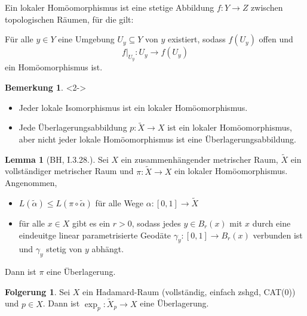 \documentclass{beamer}
\newcommand{\I}{\left[0,1\right]} %
\renewcommand{\emph}[1]{\textcolor{Emph}{#1}}
\theoremstyle{definition}
\newtheorem*{lem}{Lemma}
\newtheorem*{bem}{Bemerkung}
\newtheorem*{folg}{Folgerung}
\begin{document}
\begin{frame}
  \begin{definition}
    Ein \emph{lokaler Homöomorphismus} ist eine stetige Abbildung $f : Y \to Z$ zwischen topologischen Räumen, für die gilt:

    Für alle $y \in Y$ eine Umgebung $U_y \subseteq Y$ von $y$ existiert, sodass $f(U_y)$ offen und
    \[ f|_{U_y} : U_y \to f(U_y) \]
    ein Homöomorphismus ist.
  \end{definition}

  \begin{bem}<2->
    \begin{itemize}
      \item Jeder lokale Isomorphismus ist ein lokaler Homöomorphismus.
      \item Jede Überlagerungsabbildung $p : \tilde{X} \to X$ ist ein lokaler Homöomorphismus, aber nicht jeder lokale Homöomorphismus ist eine Überlagerungsabbildung.
    \end{itemize}
  \end{bem}
\end{frame}

\begin{frame}
  \begin{lem}[BH, I.3.28.]
    Sei $X$ ein zusammenhängender metrischer Raum, $\tilde{X}$ ein vollständiger metrischer Raum und $\pi : \tilde{X} \to X$ ein lokaler Homöomorphismus. Angenommen,
    \begin{itemize}
      \item $L(\tilde{\alpha}) \leq L(\pi \circ \tilde{\alpha})$ für alle Wege $\alpha : \I \to \tilde{X}$
      \item für alle $x \in X$ gibt es ein $r > 0$, sodass jedes $y \in B_r(x)$ mit $x$ durch eine eindeuitge linear parametrisierte Geodäte $\gamma_y : \I \to B_r(x)$ verbunden ist und $\gamma_y$ stetig von $y$ abhängt.
    \end{itemize}
    Dann ist $\pi$ eine Überlagerung.
  \end{lem}

  \begin{folg}
    Sei $X$ ein Hadamard-Raum (vollständig, einfach zshgd, CAT($0$)) und $p \in X$. Dann ist $\exp_p : \tilde{X}_p \to X$ eine Überlagerung.
  \end{folg}
\end{frame}
\end{document}
